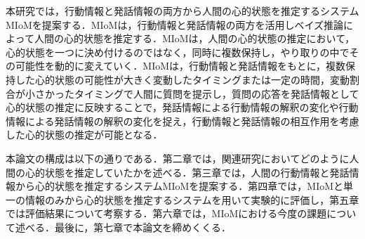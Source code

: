 \par
本研究では，行動情報と発話情報の両方から人間の心的状態を推定するシステムMIoMを提案する．MIoMは，行動情報と発話情報の両方を活用しベイズ推論によって人間の心的状態を推定する．MIoMは，人間の心的状態の推定において，心的状態を一つに決め付けるのではなく，同時に複数保持し，やり取りの中でその可能性を動的に変えていく．MIoMは，行動情報と発話情報をもとに，複数保持した心的状態の可能性が大きく変動したタイミングまたは一定の時間，変動割合が小さかったタイミングで人間に質問を提示し，質問の応答を発話情報として心的状態の推定に反映することで，発話情報による行動情報の解釈の変化や行動情報による発話情報の解釈の変化を捉え，行動情報と発話情報の相互作用を考慮した心的状態の推定が可能となる．

\par
本論文の構成は以下の通りである．第二章では，関連研究においてどのように人間の心的状態を推定していたかを述べる．第三章では，人間の行動情報と発話情報から心的状態を推定するシステムMIoMを提案する．第四章では，MIoMと単一の情報のみから心的状態を推定するシステムを用いて実験的に評価し，第五章では評価結果について考察する．第六章では，MIoMにおける今度の課題について述べる．最後に，第七章で本論文を締めくくる．
